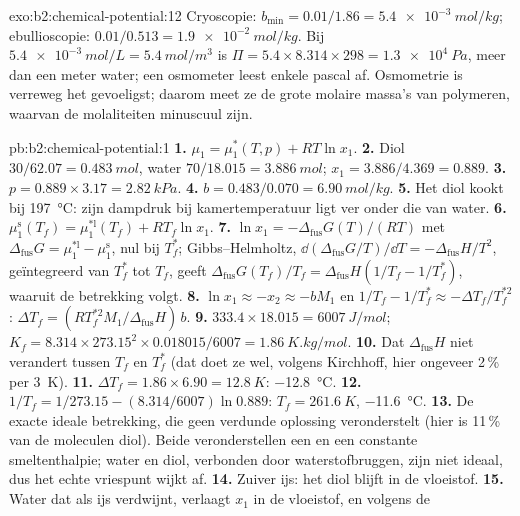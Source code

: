 \begin{solution}{exo:b2:chemical-potential:12}
Cryoscopie: $b_{\min} = 0.01/1.86 = \qty{5.4e-3}{mol/kg}$; ebullioscopie:
$0.01/0.513 = \qty{1.9e-2}{mol/kg}$. Bij $\qty{5.4e-3}{mol/L} =
\qty{5.4}{mol/m^3}$ is $\Pi = 5.4 \times 8.314 \times 298 = \qty{1.3e4}{Pa}$,
meer dan een meter water; een osmometer leest enkele pascal af. Osmometrie is
verreweg het gevoeligst; daarom meet ze de grote molaire massa's van
polymeren, waarvan de molaliteiten minuscuul zijn.
\end{solution}

\begin{solution}{pb:b2:chemical-potential:1}
\textbf{1.} $\mu_1 = \mu_1^*(T, p) + RT\ln x_1$.
\textbf{2.} Diol $30/62.07 = \qty{0.483}{mol}$, water $70/18.015 =
\qty{3.886}{mol}$; $x_1 = 3.886/4.369 = 0.889$.
\textbf{3.} $p = 0.889 \times 3.17 = \qty{2.82}{kPa}$.
\textbf{4.} $b = 0.483/0.070 = \qty{6.90}{mol/kg}$.
\textbf{5.} Het diol kookt bij \qty{197}{\celsius}: zijn dampdruk bij
kamertemperatuur ligt ver onder die van water.
\textbf{6.} $\mu_1^{\text{s}}(T_f) = \mu_1^{*\text{l}}(T_f) + RT_f\ln x_1$.
\textbf{7.} $\ln x_1 = -\Delta_{\text{fus}}G(T)/(RT)$ met
$\Delta_{\text{fus}}G = \mu_1^{*\text{l}} - \mu_1^{\text{s}}$, nul bij $T_f^*$;
Gibbs--Helmholtz, $\dd(\Delta_{\text{fus}}G/T)/\dd T = -\Delta_{\text{fus}}H/T^2$,
geïntegreerd van $T_f^*$ tot $T_f$, geeft $\Delta_{\text{fus}}G(T_f)/T_f =
\Delta_{\text{fus}}H(1/T_f - 1/T_f^*)$, waaruit de betrekking volgt.
\textbf{8.} $\ln x_1 \approx -x_2 \approx -bM_1$ en $1/T_f - 1/T_f^* \approx
-\Delta T_f/T_f^{*2}$: $\Delta T_f = (RT_f^{*2}M_1/\Delta_{\text{fus}}H)\,b$.
\textbf{9.} $333.4 \times 18.015 = \qty{6007}{J/mol}$; $K_f = 8.314 \times
273.15^2 \times 0.018015/6007 = \qty{1.86}{K.kg/mol}$.
\textbf{10.} Dat $\Delta_{\text{fus}}H$ niet verandert tussen $T_f$ en
$T_f^*$ (dat doet ze wel, volgens Kirchhoff, hier ongeveer 2\,\% per \qty{3}{K}).
\textbf{11.} $\Delta T_f = 1.86 \times 6.90 = \qty{12.8}{K}$: \qty{-12.8}{\celsius}.
\textbf{12.} $1/T_f = 1/273.15 - (8.314/6007)\ln 0.889$: $T_f = \qty{261.6}{K}$,
\qty{-11.6}{\celsius}.
\textbf{13.} De exacte ideale betrekking, die geen verdunde oplossing
veronderstelt (hier is 11\,\% van de moleculen diol). Beide veronderstellen een 
en een constante smeltenthalpie; water en diol, verbonden door waterstofbruggen,
zijn niet ideaal, dus het echte vriespunt wijkt af.
\textbf{14.} Zuiver ijs: het diol blijft in de vloeistof.
\textbf{15.} Water dat als ijs verdwijnt, verlaagt $x_1$ in de vloeistof, en volgens de

\end{solution}
